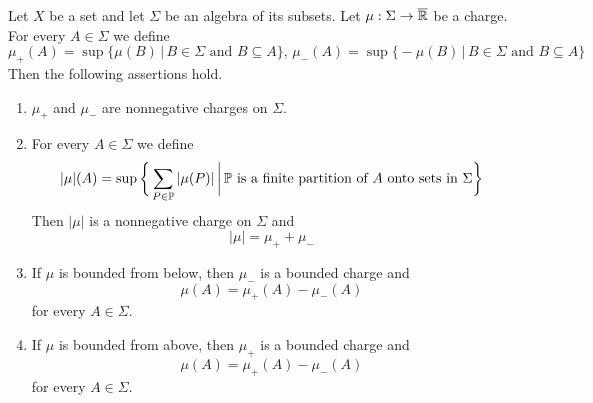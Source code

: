 \begin{theorem}\label{theorem:Jordan_decomposition}
    Let $X$ be a set and let $\Sigma$ be an algebra of its subsets. Let $\mu:\Sigma \rightarrow \overline{{\mathbb R}}$ be a charge. For every $A \in \Sigma$ we define
    $$\mu_+(A) = \sup\big\{\mu(B)\,\big|\,B\in \Sigma\mbox{ and }B\subseteq A\big\},\,\mu_-(A) = \sup\big\{-\mu(B)\,\big|\,B\in \Sigma\mbox{ and }B\subseteq A\big\}$$
    Then the following assertions hold.
    \begin{enumerate}[label=\emph{\textbf{(\arabic*)}}, leftmargin=*]
        \item $\mu_+$ and $\mu_-$ are nonnegative charges on $\Sigma$.
        \item For every $A \in \Sigma$ we define
              $$|\mu|(A) = \sup \bigg\{\sum_{P\in {\mathbb P}}|\mu(P)|\,\bigg|\,{\mathbb P}\mbox{ is a finite partition of }A\mbox{ onto sets in }\Sigma\bigg\}$$
              Then $|\mu|$ is a nonnegative charge on $\Sigma$ and
              $$|\mu| = \mu_+ + \mu_-$$
        \item If $\mu$ is bounded from below, then $\mu_-$ is a bounded charge and
              $$\mu(A) = \mu_+(A) - \mu_-(A)$$
              for every $A \in \Sigma$.
        \item If $\mu$ is bounded from above, then $\mu_+$ is a bounded charge and
              $$\mu(A) = \mu_+(A) - \mu_-(A)$$
              for every $A \in \Sigma$.
    \end{enumerate}
\end{theorem}
